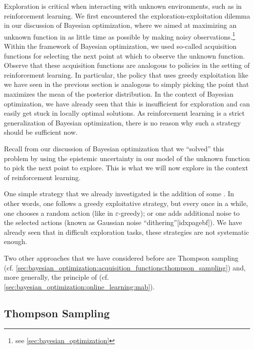 Exploration is critical when interacting with unknown environments, such as in reinforcement learning.
We first encountered the exploration-exploitation dilemma in our discussion of Bayesian optimization, where we aimed at maximizing an unknown function in as little time as possible by making noisy observations.\footnote{see \cref{sec:bayesian_optimization}}
Within the framework of Bayesian optimization, we used so-called acquisition functions for selecting the next point at which to observe the unknown function.
Observe that these acquisition functions are analogous to policies in the setting of reinforcement learning.
In particular, the policy that uses greedy exploitation like we have seen in the previous section is analogous to simply picking the point that maximizes the mean of the posterior distribution.
In the context of Bayesian optimization, we have already seen that this is insufficient for exploration and can easily get stuck in locally optimal solutions.
As reinforcement learning is a strict generalization of Bayesian optimization, there is no reason why such a strategy should be sufficient now.

Recall from our discussion of Bayesian optimization that we ``solved'' this problem by using the epistemic uncertainty in our model of the unknown function to pick the next point to explore.
This is what we will now explore in the context of reinforcement learning.

One simple strategy that we already investigated is the addition of some .
In other words, one follows a greedy exploitative strategy, but every once in a while, one chooses a random action (like in $\varepsilon$-greedy); or one adds additional noise to the selected actions (known as Gaussian noise ``dithering''[idxpagebf]).
We have already seen that in difficult exploration tasks, these strategies are not systematic enough.

Two other approaches that we have considered before are Thompson sampling (cf. \cref{sec:bayesian_optimization:acquisition_functions:thompson_sampling}) and, more generally, the principle of  (cf. \cref{sec:bayesian_optimization:online_learning:mab}).

\subsection{Thompson Sampling}

